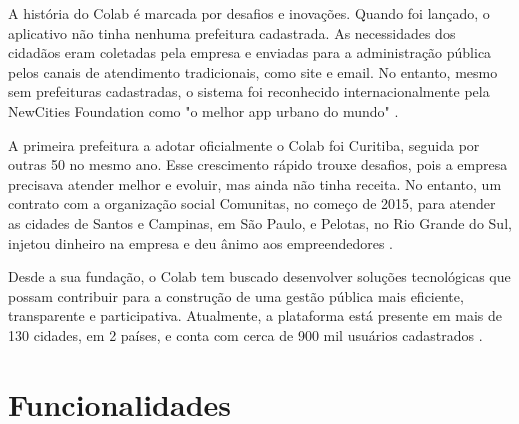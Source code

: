 A história do Colab é marcada por desafios e inovações. Quando foi lançado, o aplicativo não tinha nenhuma prefeitura cadastrada. As necessidades dos cidadãos eram coletadas pela empresa e enviadas para a administração pública pelos canais de atendimento tradicionais, como site e email. No entanto, mesmo sem prefeituras cadastradas, o sistema foi reconhecido internacionalmente pela NewCities Foundation como "o melhor app urbano do mundo" \cite{2023_Colab_PAGE}.

A primeira prefeitura a adotar oficialmente o Colab foi Curitiba, seguida por outras 50 no mesmo ano. Esse crescimento rápido trouxe desafios, pois a empresa precisava atender melhor e evoluir, mas ainda não tinha receita. No entanto, um contrato com a organização social Comunitas, no começo de 2015, para atender as cidades de Santos e Campinas, em São Paulo, e Pelotas, no Rio Grande do Sul, injetou dinheiro na empresa e deu ânimo aos empreendedores \cite{2023_Colab_PAGE}.

Desde a sua fundação, o Colab tem buscado desenvolver soluções tecnológicas que possam contribuir para a construção de uma gestão pública mais eficiente, transparente e participativa. Atualmente, a plataforma está presente em mais de 130 cidades, em 2 países, e conta com cerca de 900 mil usuários cadastrados \cite{2023_Colab_PAGE}.

\section{Funcionalidades}

